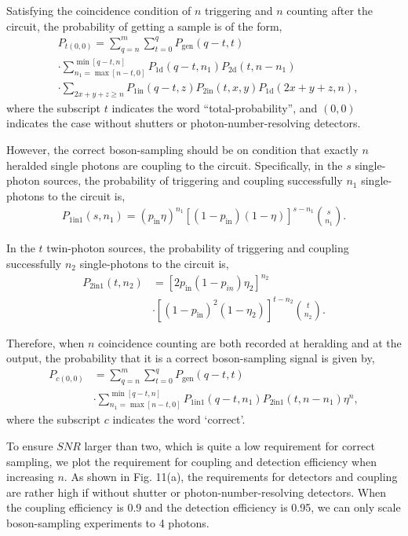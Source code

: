 \documentclass[aps,rmp,twocolumn,amsmath,amssymb,nofootinbib,superscriptaddress]{revtex4}
\begin{document}
Satisfying the coincidence condition of $n$ triggering and $n$ counting after the circuit, the probability of getting a sample is of the form,
\begin{align} \label{eq:6}
&{P_{t(0,0)}} = \sum_{q = n}^m {\sum\limits_{t = 0}^q {{P_\mathrm{gen}}(q - t,t) }} \nonumber \\
&\cdot \sum_{n_1 = \max [n - t,0]}^{\min [q - t,n]} {{P_\mathrm{1d}}(q - t,{n_1})}{P_\mathrm{2d}}(t,n - {n_1}) \nonumber \\
&\cdot \sum_{2x + y + z \ge n} {{P_\mathrm{1in}}(q - t,z){P_\mathrm{2in}}(t,x,y)}{P_\mathrm{1d}}(2x + y + z,n),
\end{align}
where the subscript $t$ indicates the word ``total-probability'', and $(0,0)$ indicates the case without shutters or photon-number-resolving detectors.

However, the correct boson-sampling should be on condition that exactly $n$ heralded single photons are coupling to the circuit. Specifically, in the $s$ single-photon sources, the probability of triggering and coupling successfully ${n_1}$ single-photons to the circuit is,
\begin{align} \label{eq:7}
{P_\mathrm{1in1}}(s,{n_1}) = {({p_\mathrm{in}}\eta )^{{n_1}}} {[(1 - {p_\mathrm{in}})(1 - \eta )]^{s - {n_1}}} \binom{s}{n_1}.
\end{align}

In the $t$ twin-photon sources, the probability of triggering and coupling successfully ${n_2}$ single-photons to the circuit is,
\begin{align} \label{eq:8}
{P_\mathrm{2in1}}(t,{n_2}) &= {[2{p_\mathrm{in}}(1 - {p_{in}}){\eta_2}]^{{n_2}}} \nonumber \\
&\cdot {[{(1 - {p_\mathrm{in}})^2}(1 - {\eta _2})]^{t - {n_2}}}\binom{t}{n_2}.
\end{align}

Therefore, when $n$ coincidence counting are both recorded at heralding and at the output, the probability that it is a correct boson-sampling signal is given by,
\begin{align} \label{eq:9}
{P_{c(0,0)}} &= \sum_{q = n}^m {\sum_{t = 0}^q {{P_\mathrm{gen}}} } (q - t,t) \nonumber \\
&\cdot\sum_{{n_1} = \max [n - t,0]}^{\min [q - t,n]} {{P_\mathrm{1in1}}(q - t,{n_1})} {P_\mathrm{2in1}}(t,n - {n_1}){\eta ^n},
\end{align}
where the subscript $c$ indicates the word `correct'.

To ensure $SNR$ larger than two, which is quite a low requirement for correct sampling, we plot the requirement for coupling and detection efficiency when increasing $n$. As shown in Fig. 11(a), the requirements for detectors and coupling are rather high if without shutter or photon-number-resolving detectors. When the coupling efficiency is 0.9 and the detection efficiency is 0.95, we can only scale boson-sampling experiments to 4 photons.
\end{document}

